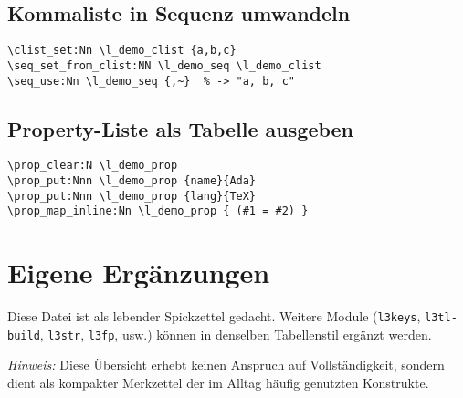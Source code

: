 \documentclass[a4paper,11pt]{article}
\begin{document}
\subsection{Kommaliste in Sequenz umwandeln}
\begin{verbatim}
\clist_set:Nn \l_demo_clist {a,b,c}
\seq_set_from_clist:NN \l_demo_seq \l_demo_clist
\seq_use:Nn \l_demo_seq {,~}  % -> "a, b, c"
\end{verbatim}

\subsection{Property-Liste als Tabelle ausgeben}
\begin{verbatim}
\prop_clear:N \l_demo_prop
\prop_put:Nnn \l_demo_prop {name}{Ada}
\prop_put:Nnn \l_demo_prop {lang}{TeX}
\prop_map_inline:Nn \l_demo_prop { (#1 = #2) }
\end{verbatim}

\section{Eigene Ergänzungen}
Diese Datei ist als lebender Spickzettel gedacht. Weitere Module (\texttt{l3keys}, \texttt{l3tl-build}, \texttt{l3str}, \texttt{l3fp}, usw.) können in denselben Tabellenstil ergänzt werden.

\bigskip
\noindent\textit{Hinweis:} Diese Übersicht erhebt keinen Anspruch auf Vollständigkeit, sondern dient als kompakter Merkzettel der im Alltag häufig genutzten Konstrukte.
\end{document}
